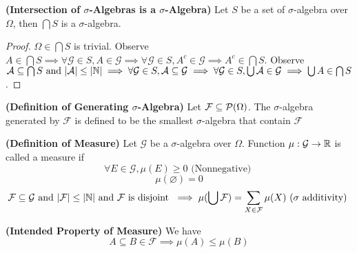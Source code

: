 \documentclass{report}
\begin{document}
\begin{lemma}
\label{0.1.3}
\textbf{(Intersection of $\sigma$-Algebras is a $\sigma$-Algebra)} Let $S$ be a set of $\sigma$-algebra over $\Omega$, then $\bigcap S$ is a $\sigma$-algebra. 
\end{lemma}
\begin{proof}
  $\Omega\in \bigcap S$ is trivial. Observe $A\in \bigcap S\implies  \forall \mathcal{G}\in S, A\in \mathcal{G}\implies \forall \mathcal{G}\in S, A^c\in \mathcal{G}\implies A^c \in\bigcap S$. Observe $\mathcal{A}\subseteq \bigcap S\text{ and }|\mathcal{A}|\leq |\mathbb{N}|\implies \forall\mathcal{G}\in S, \mathcal{A}\subseteq \mathcal{G}\implies \forall \mathcal{G}\in S, \bigcup \mathcal{A} \in\mathcal{G}\implies \bigcup A\in \bigcap S$.
\end{proof}
\begin{definition}
\label{0.1.4}
\textbf{(Definition of Generating $\sigma$-Algebra)} Let $\mathcal{F}\subseteq \mathcal{P}(\Omega)$. The $\sigma$-algebra generated by $\mathcal{F}$ is defined to be the smallest  $\sigma$-algebra that contain $\mathcal{F}$
\end{definition}
\begin{definition}
\label{0.1.5}
  \textbf{(Definition of Measure)} Let $\mathcal{G}$ be a $\sigma$-algebra over $\Omega$. Function $\mu:\mathcal{G}\rightarrow \mathbb{R}$ is called a measure if
\begin{equation}
\forall E\in \mathcal{G}, \mu(E)\geq 0\text{ (Nonnegative) }
\end{equation}  
\begin{equation}
\mu(\varnothing)=0
\end{equation}
\begin{equation}
\mathcal{F}\subseteq \mathcal{G}\text{ and }|\mathcal{F}|\leq |\mathbb{N}|\text{ and }\mathcal{F}\text{ is disjoint }\implies \mu(\bigcup  \mathcal{F})=\sum_{X\in \mathcal{F}} \mu(X)\text{ ($\sigma$ additivity) }
\end{equation}
\end{definition}
\begin{theorem}
\label{0.1.6}
\textbf{(Intended Property of Measure)} We have
\begin{equation}
A\subseteq B\in \mathcal{F}\implies \mu(A)\leq  \mu(B)
\end{equation}
\end{theorem}
\end{document}
